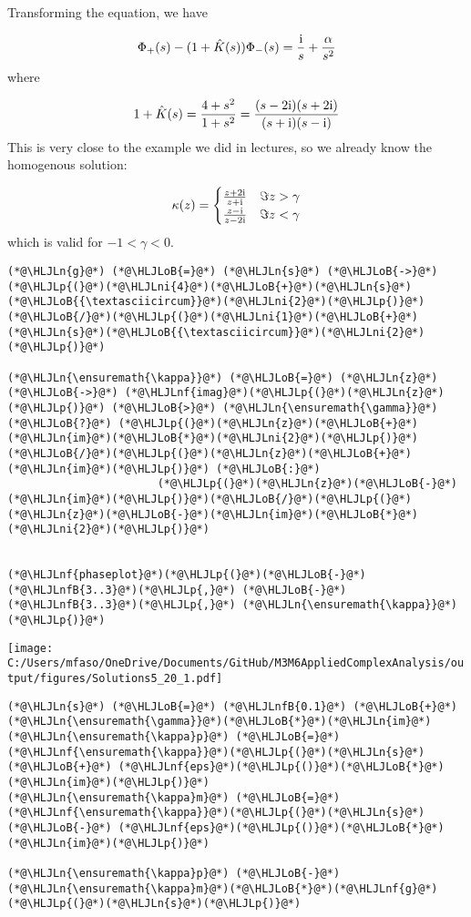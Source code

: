 \documentclass[12pt,a4paper]{article}
\newcommand{\HLJLn}[1]{#1}
\newcommand{\HLJLnf}[1]{\textcolor[RGB]{66,102,213}{#1}}
\newcommand{\HLJLnfB}[1]{\textcolor[RGB]{59,151,46}{#1}}
\newcommand{\HLJLni}[1]{\textcolor[RGB]{59,151,46}{#1}}
\newcommand{\HLJLoB}[1]{\textcolor[RGB]{102,102,102}{\textbf{#1}}}
\newcommand{\HLJLp}[1]{#1}
\def\I{ {\rm i} }
\begin{document}
Transforming the equation, we have

\[
\Phi_+(s) - (1 + \hat K(s)) \Phi_-(s)  = {\I \over s} + {\alpha \over s^2}
\]
where

\[
1 + \hat K(s) = {4 + s^2 \over 1 + s^2} = {(s-2 \I) (s+2 \I) \over (s+\I)(s-\I)}
\]
This is very close to the example we did in lectures, so we already know the homogenous solution:

\[
\kappa(z) =  \begin{cases} {z + 2\I  \over z + \I}  & \Im z > \gamma \\
                            {z - \I  \over z - 2\I} & \Im z < \gamma
                            \end{cases}
\]
which is valid for $-1 < \gamma < 0$.


\begin{lstlisting}
(*@\HLJLn{g}@*) (*@\HLJLoB{=}@*) (*@\HLJLn{s}@*) (*@\HLJLoB{->}@*) (*@\HLJLp{(}@*)(*@\HLJLni{4}@*)(*@\HLJLoB{+}@*)(*@\HLJLn{s}@*)(*@\HLJLoB{{\textasciicircum}}@*)(*@\HLJLni{2}@*)(*@\HLJLp{)}@*)(*@\HLJLoB{/}@*)(*@\HLJLp{(}@*)(*@\HLJLni{1}@*)(*@\HLJLoB{+}@*)(*@\HLJLn{s}@*)(*@\HLJLoB{{\textasciicircum}}@*)(*@\HLJLni{2}@*)(*@\HLJLp{)}@*)

(*@\HLJLn{\ensuremath{\kappa}}@*) (*@\HLJLoB{=}@*) (*@\HLJLn{z}@*) (*@\HLJLoB{->}@*) (*@\HLJLnf{imag}@*)(*@\HLJLp{(}@*)(*@\HLJLn{z}@*)(*@\HLJLp{)}@*) (*@\HLJLoB{>}@*) (*@\HLJLn{\ensuremath{\gamma}}@*) (*@\HLJLoB{?}@*) (*@\HLJLp{(}@*)(*@\HLJLn{z}@*)(*@\HLJLoB{+}@*)(*@\HLJLn{im}@*)(*@\HLJLoB{*}@*)(*@\HLJLni{2}@*)(*@\HLJLp{)}@*)(*@\HLJLoB{/}@*)(*@\HLJLp{(}@*)(*@\HLJLn{z}@*)(*@\HLJLoB{+}@*)(*@\HLJLn{im}@*)(*@\HLJLp{)}@*) (*@\HLJLoB{:}@*)
                       (*@\HLJLp{(}@*)(*@\HLJLn{z}@*)(*@\HLJLoB{-}@*)(*@\HLJLn{im}@*)(*@\HLJLp{)}@*)(*@\HLJLoB{/}@*)(*@\HLJLp{(}@*)(*@\HLJLn{z}@*)(*@\HLJLoB{-}@*)(*@\HLJLn{im}@*)(*@\HLJLoB{*}@*)(*@\HLJLni{2}@*)(*@\HLJLp{)}@*)


(*@\HLJLnf{phaseplot}@*)(*@\HLJLp{(}@*)(*@\HLJLoB{-}@*)(*@\HLJLnfB{3..3}@*)(*@\HLJLp{,}@*) (*@\HLJLoB{-}@*)(*@\HLJLnfB{3..3}@*)(*@\HLJLp{,}@*) (*@\HLJLn{\ensuremath{\kappa}}@*)(*@\HLJLp{)}@*)
\end{lstlisting}

\texttt{[image: C:/Users/mfaso/OneDrive/Documents/GitHub/M3M6AppliedComplexAnalysis/output/figures/Solutions5\_20\_1.pdf]}

\begin{lstlisting}
(*@\HLJLn{s}@*) (*@\HLJLoB{=}@*) (*@\HLJLnfB{0.1}@*) (*@\HLJLoB{+}@*) (*@\HLJLn{\ensuremath{\gamma}}@*)(*@\HLJLoB{*}@*)(*@\HLJLn{im}@*)
(*@\HLJLn{\ensuremath{\kappa}p}@*) (*@\HLJLoB{=}@*) (*@\HLJLnf{\ensuremath{\kappa}}@*)(*@\HLJLp{(}@*)(*@\HLJLn{s}@*) (*@\HLJLoB{+}@*) (*@\HLJLnf{eps}@*)(*@\HLJLp{()}@*)(*@\HLJLoB{*}@*)(*@\HLJLn{im}@*)(*@\HLJLp{)}@*)
(*@\HLJLn{\ensuremath{\kappa}m}@*) (*@\HLJLoB{=}@*) (*@\HLJLnf{\ensuremath{\kappa}}@*)(*@\HLJLp{(}@*)(*@\HLJLn{s}@*) (*@\HLJLoB{-}@*) (*@\HLJLnf{eps}@*)(*@\HLJLp{()}@*)(*@\HLJLoB{*}@*)(*@\HLJLn{im}@*)(*@\HLJLp{)}@*)

(*@\HLJLn{\ensuremath{\kappa}p}@*) (*@\HLJLoB{-}@*) (*@\HLJLn{\ensuremath{\kappa}m}@*)(*@\HLJLoB{*}@*)(*@\HLJLnf{g}@*)(*@\HLJLp{(}@*)(*@\HLJLn{s}@*)(*@\HLJLp{)}@*)
\end{lstlisting}
\end{document}
